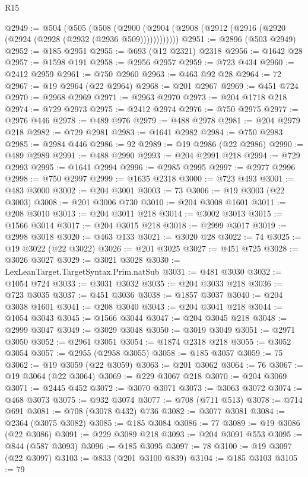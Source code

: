 \begin{lexlean}{R15}
\begin{coremodule}
{{{{{{{{{{{@2949 := @504
    (@505
      (@508 (@2900 (@2904 (@2908 (@2912 (@2916 (@2920 (@2924 (@2928 (@2932 (@2936 @509))))))))))))
@2951 := @2896 (@503 @2949)
@2952 := @185 @2951
@2955 := @693 (@12 @2321) @2318
@2956 := @1642 @28
@2957 := @1598 @191
@2958 := @2956 @2957
@2959 := @723 @434
@2960 := @2412 @2959
@2961 := @750 @2960
@2963 := @463 @92 @28
@2964 := 72
@2967 := @19 @2964 (@22 @2964)
@2968 := @201 @2967
@2969 := @451 @724
@2970 := @2968 @2969
@2971 := @2963 @2970
@2973 := @204 @1718 @218
@2974 := @729 @2973
@2975 := @2412 @2974
@2976 := @750 @2975
@2977 := @2976 @446
@2978 := @489 @976
@2979 := @488 @2978
@2981 := @204 @2979 @218
@2982 := @729 @2981
@2983 := @1641 @2982
@2984 := @750 @2983
@2985 := @2984 @446
@2986 := 92
@2989 := @19 @2986 (@22 @2986)
@2990 := @489 @2989
@2991 := @488 @2990
@2993 := @204 @2991 @218
@2994 := @729 @2993
@2995 := @1641 @2994
@2996 := @2985 @2995
@2997 := @2977 @2996
@2998 := @750 @2997
@2999 := @1635 @2318
@3000 := @723 @493
@3001 := @483 @3000
@3002 := @204 @3001
@3003 := 73
@3006 := @19 @3003 (@22 @3003)
@3008 := @201 @3006 @730
@3010 := @204 @3008 @1601
@3011 := @208 @3010
@3013 := @204 @3011 @218
@3014 := @3002 @3013
@3015 := @1566 @3014
@3017 := @204 @3015 @218
@3018 := @2999 @3017
@3019 := @2998 @3018
@3020 := @463 @133
@3021 := @3020 @28
@3022 := 74
@3025 := @19 @3022 (@22 @3022)
@3026 := @201 @3025
@3027 := @451 @725
@3028 := @3026 @3027
@3029 := @3021 @3028
@3030 := LexLeanTarget.TargetSyntax.Prim.natSub
@3031 := @481 @3030
@3032 := @1054 @724
@3033 := @3031 @3032
@3035 := @204 @3033 @218
@3036 := @723 @3035
@3037 := @451 @3036
@3038 := @1857 @3037
@3040 := @204 @3038 @1601
@3041 := @208 @3040
@3043 := @204 @3041 @218
@3044 := @1054 @3043
@3045 := @1566 @3044
@3047 := @204 @3045 @218
@3048 := @2999 @3047
@3049 := @3029 @3048
@3050 := @3019 @3049
@3051 := @2971 @3050
@3052 := @2961 @3051
@3054 := @1874 @2318 @218
@3055 := @3052 @3054
@3057 := @2955 (@2958 @3055)
@3058 := @185 @3057
@3059 := 75
@3062 := @19 @3059 (@22 @3059)
@3063 := @201 @3062
@3064 := 76
@3067 := @19 @3064 (@22 @3064)
@3069 := @229 @3067 @218
@3070 := @204 @3069
@3071 := @2445 @452
@3072 := @3070 @3071
@3073 := @3063 @3072
@3074 := @468 @3073
@3075 := @932 @3074
@3077 := @708 (@711 @513)
@3078 := @714 @691
@3081 := @708 (@3078 @432) @736
@3082 := @3077 @3081
@3084 := @2364 (@3075 @3082)
@3085 := @185 @3084
@3086 := 77
@3089 := @19 @3086 (@22 @3086)
@3091 := @229 @3089 @218
@3093 := @204 @3091 @553
@3095 := @844 (@587 @3093)
@3096 := @185 @3095
@3097 := 78
@3100 := @19 @3097 (@22 @3097)
@3103 := @833 (@201 @3100 @839)
@3104 := @185 @3103
@3105 := 79
}}}}}}}}}}}
\end{coremodule}
\end{lexlean}
